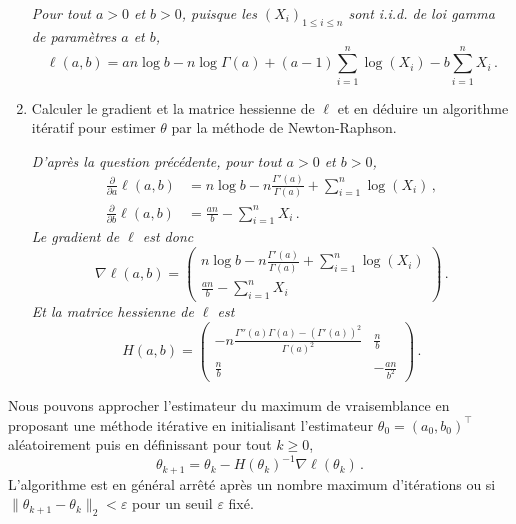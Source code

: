 \documentclass[a4paper,10pt,fleqn]{article}
\newcommand{\1}{\ensuremath{\mathbbm{1}}}
\begin{document}
\begin{enumerate}
{\em Pour tout $a>0$ et $b>0$, puisque les $(X_i)_{1\leq i \leq n}$ sont i.i.d. de loi gamma de param\`etres $a$ et $b$, 
$$
\ell(a,b) = an \log b- n \log \Gamma(a) + (a-1)\sum_{i=1}^n \log(X_i) -b \sum_{i=1}^n X_i\,.
$$}

\item Calculer le gradient et la matrice hessienne de $\ell$ et en d\'eduire un algorithme it\'eratif pour estimer $\theta$ par la m\'ethode de  Newton-Raphson.

\vspace{.2cm}

{\em D'apr\`es la question pr\'ec\'edente, pour tout $a>0$ et $b>0$,
\begin{align*}
\frac{\partial}{\partial a}\ell(a,b) &= n \log b- n \frac{\Gamma'(a)}{\Gamma(a)} + \sum_{i=1}^n \log(X_i)\,,\\
\frac{\partial}{\partial b}\ell(a,b) &= \frac{an}{b} - \sum_{i=1}^n X_i\,.
\end{align*}
Le gradient de $\ell$ est donc
$$
\nabla\ell(a,b) = \begin{pmatrix}n \log b- n \frac{\Gamma'(a)}{\Gamma(a)} + \sum_{i=1}^n \log(X_i) \\ \frac{an}{b} - \sum_{i=1}^n X_i\end{pmatrix}\,.
$$
Et la matrice hessienne de $\ell$ est
$$
H(a,b) =\begin{pmatrix} - n \frac{\Gamma''(a)\Gamma(a) - (\Gamma'(a))^2}{\Gamma(a)^2}& \frac{n}{b}\\ \frac{n}{b}& -\frac{an}{b^2} \end{pmatrix}\,.
$$}
\end{enumerate}
Nous pouvons approcher l'estimateur du maximum de vraisemblance en proposant une m\'ethode it\'erative en initialisant l'estimateur $\theta_0 = (a_0,b_0)^\top$ al\'eatoirement puis en d\'efinissant pour tout $k\geq 0$,
$$
\theta_{k+1} = \theta_k - H(\theta_k)^{-1}\nabla\ell(\theta_k)\,.
$$
L'algorithme est en g\'en\'eral arr\^et\'e apr\`es un nombre maximum d'it\'erations ou si $\|\theta_{k+1} - \theta_k\|_2<\varepsilon$ pour un seuil $\varepsilon$ fix\'e.
\end{document}
